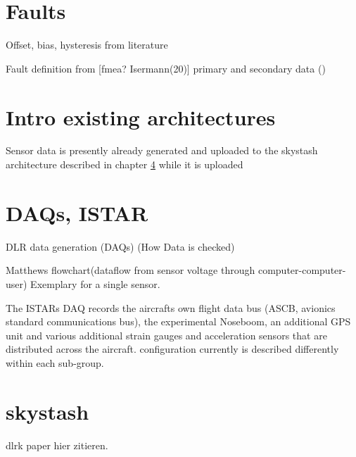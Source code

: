 \section{Faults}
Offset, bias, hysteresis from literature

Fault definition from [fmea? Isermann(20)]
primary and secondary data (\cite{giez_determination_2022})


\section{Intro existing architectures}
Sensor data is presently already generated and uploaded to the skystash architecture described in chapter \ref{chap:skystash} while it is uploaded


\section{DAQs, ISTAR}
DLR data generation (DAQs) (How Data is checked)

Matthews flowchart(dataflow from sensor voltage through computer-computer-user)
Exemplary for a single sensor.

The ISTARs DAQ records the aircrafts own flight data bus (ASCB, avionics standard communications bus), the experimental Noseboom, an additional GPS unit and various additional strain gauges and acceleration sensors that are distributed across the aircraft. configuration currently is described differently within each sub-group.


\section{skystash}
\label{chap:skystash}

dlrk paper hier zitieren.

